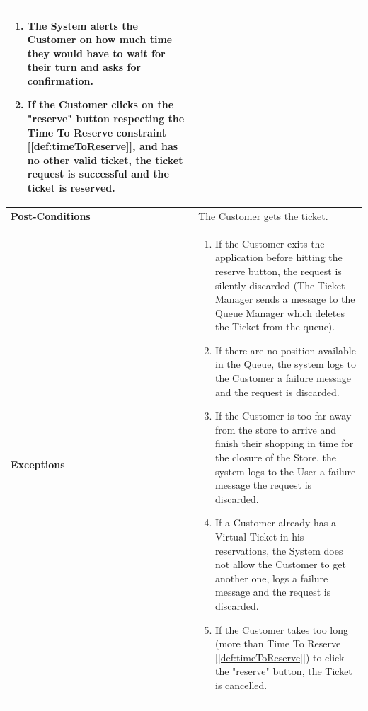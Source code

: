 \documentclass[a4paper, 12pt, oneside]{article}
\begin{document}
\begin{enumerate}[labelindent=20pt, label={UC.\arabic*}, itemindent=1em,leftmargin=!]
\begin{tabularx}{\linewidth}{| l | X |}
{\begin{enumerate}
            \item The System alerts the Customer on how much time they would have to wait for their turn and asks for confirmation.
            \item If the Customer clicks on the "reserve" button respecting the Time To Reserve constraint [\ref{def:timeToReserve}], and has no other valid ticket, the ticket request is successful and the ticket is reserved.
    \end{enumerate}}\\
    
    \hline
    \textbf{Post-Conditions} & The Customer gets the ticket.\\
    
    \hline
    \textbf{Exceptions} & \parbox{0.7\textwidth}{ \begin{enumerate}
            \item If the Customer exits the application before hitting the reserve button, the request is silently discarded (The Ticket Manager sends a message to the Queue Manager which deletes the Ticket from the queue).
            \item If there are no position available in the Queue, the system logs to the Customer a failure message and the request is discarded.
            \item If the Customer is too far away from the store to arrive and finish their shopping in time for the closure of the Store, the system logs to the User a failure message the request is discarded.
            \item If a Customer already has a Virtual Ticket in his reservations, the System does not allow the Customer to get another one, logs a failure message and the request is discarded.
            \item If the Customer takes too long (more than Time To Reserve [\ref{def:timeToReserve}]) to click the "reserve" button, the Ticket is cancelled.
        \end{enumerate}}\\

    \hline
    
\end{tabularx}


\end{enumerate}
\end{document}
